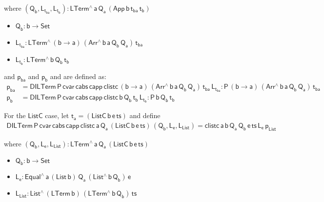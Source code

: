 \documentclass[acmsmall,screen,review,anonymous]{acmart}
\theoremstyle{definition}
\begin{document}
\noindent
where $\mathsf{(Q_b , L_{t_{ba}}, L_{t_b}) : LTerm^{\wedge}\, a\, Q_a\, (App \,b \,t_{ba} \, t_b)}$
\begin{itemize}
  \item $\mathsf{Q_b : b \to Set}$
  \item $\mathsf{L_{t_{ba}}: LTerm^{\wedge} \, (b \to a)\, (Arr^{\wedge} \, b\, a\, Q_b \, Q_a)\, t_{ba}}$
  \item $\mathsf{L_{t_b}: LTerm^{\wedge} \, b\, Q_b\, t_b}$
\end{itemize}
and $\mathsf{p_{ba}}$ and $\mathsf{p_b}$
and are defined as:
\begin{align*}
  \mathsf{p_{ba}} &=  \mathsf{DILTerm\,P\,cvar\,cabs \,capp \,clistc\, (b \to a)\,(Arr^{\wedge} \, b\, a\, Q_b \, Q_a) \, t_{ba}\, L_{t_{ba}}   : P \, (b \to a)\, (Arr^{\wedge} \, b\, a\, Q_b \, Q_a) \, t_{ba} } \\
  \mathsf{p_b   } &=  \mathsf{DILTerm\,P\,cvar\,cabs \,capp \,clistc\, b\, Q_b\, t_b\, L_{t_b}  : P \, b\, Q_b \, t_b } 
\end{align*}

\noindent
For the $\mathsf{ListC}$ case, let $\mathsf{t_a = (ListC \,b \,e \, ts)} $ and define
\begin{multline*}
  \mathsf{DILTerm \, P\, cvar \, cabs\, capp\, clistc \, a\, Q_a\, (ListC \,b \,e \, ts) \, (Q_b , L_e, L_{List})
  = clistc \,a\,b\,Q_a\, Q_b\, e\, ts\, L_e\, p_{List} }
\end{multline*}


\noindent
where $\mathsf{(Q_b , L_e, L_{List}): LTerm^{\wedge}\, a\, Q_a\, (ListC \,b \,e \, ts)}$
\begin{itemize}
  \item $\mathsf{Q_b : b \to Set}$
  \item $\mathsf{L_e : Equal^{\wedge}\, a\, (List\,b)\, Q_a\, (List^{\wedge}\, b\, Q_b)\, e}$
  \item $\mathsf{L_{List}: List^{\wedge} \, (LTerm\, b) \, (LTerm^{\wedge}\, b\, Q_b) \, ts}$
\end{itemize}
\end{document}
